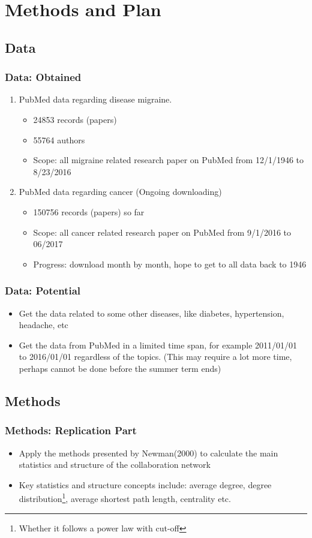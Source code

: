 \documentclass{beamer}
\begin{document}
\section{Methods and Plan}
\begin{frame}
\end{frame}

\subsection{Data}
\begin{frame}\frametitle{Data: Obtained}
\begin{enumerate}
\item  PubMed data regarding disease migraine.
	\begin{itemize}
		\item 24853 records (papers)
		\item 55764 authors
		\item Scope: all migraine related research paper on PubMed from 12/1/1946 to 8/23/2016
	\end{itemize}
\item PubMed data regarding cancer (Ongoing downloading)
	\begin{itemize}
		\item 150756 records (papers) so far
		\item Scope: all cancer related research paper on PubMed from 9/1/2016 to 06/2017
		\item Progress: download month by month, hope to get to all data back to 1946
	\end{itemize}
\end{enumerate}
\end{frame}

\begin{frame}\frametitle{Data: Potential}
\begin{itemize}
\item Get the data related to some other diseases, like diabetes, hypertension, headache, etc
\item Get the data from PubMed in a limited time span, for example 2011/01/01 to 2016/01/01 regardless of the topics. (This may require a lot more time, perhaps cannot be done before the summer term ends)
\end{itemize}
\end{frame}

\subsection{Methods}
\begin{frame}\frametitle{Methods: Replication Part}
	\begin{itemize}
\item Apply the methods presented by Newman(2000) to calculate the main statistics and structure of the collaboration network 
\item Key statistics and structure concepts include: average degree, degree distribution\footnote{Whether it follows a power law with cut-off}, average shortest path length, centrality etc. 
	\end{itemize}
\end{frame}
\end{document}
